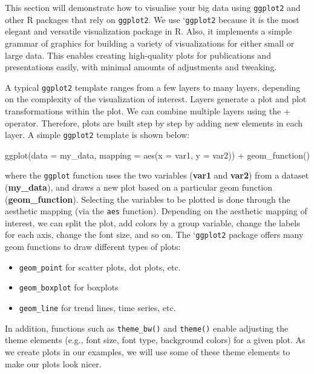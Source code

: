 \documentclass[
]{book}
\newenvironment{Shaded}{\begin{snugshade}}{\end{snugshade}}
\newcommand{\AttributeTok}[1]{\textcolor[rgb]{0.77,0.63,0.00}{#1}}
\newcommand{\FunctionTok}[1]{\textcolor[rgb]{0.00,0.00,0.00}{#1}}
\newcommand{\NormalTok}[1]{#1}
\newcommand{\SpecialCharTok}[1]{\textcolor[rgb]{0.00,0.00,0.00}{#1}}
\providecommand{\tightlist}{%
  \setlength{\itemsep}{0pt}\setlength{\parskip}{0pt}}
\begin{document}
This section will demonstrate how to visualise your big data using \texttt{ggplot2} and other R packages that rely on \texttt{ggplot2}. We use `\texttt{ggplot2} because it is the most elegant and versatile visualization package in R. Also, it implements a simple grammar of graphics for building a variety of visualizations for either small or large data. This enables creating high-quality plots for publications and presentations easily, with minimal amounts of adjustments and tweaking.

A typical \texttt{ggplot2} template ranges from a few layers to many layers, depending on the complexity of the visualization of interest. Layers generate a plot and plot transformations within the plot. We can combine multiple layers using the + operator. Therefore, plots are built step by step by adding new elements in each layer. A simple \texttt{ggplot2} template is shown below:

\begin{Shaded}
\begin{Highlighting}[]
\FunctionTok{ggplot}\NormalTok{(}\AttributeTok{data =}\NormalTok{ my\_data,}
       \AttributeTok{mapping =} \FunctionTok{aes}\NormalTok{(}\AttributeTok{x =}\NormalTok{ var1, }\AttributeTok{y =}\NormalTok{ var2)) }\SpecialCharTok{+}
  \FunctionTok{geom\_function}\NormalTok{()}
\end{Highlighting}
\end{Shaded}

where the \texttt{ggplot} function uses the two variables (\textbf{var1} and \textbf{var2}) from a dataset (\textbf{my\_data}), and draws a new plot based on a particular geom function (\textbf{geom\_function}). Selecting the variables to be plotted is done through the aesthetic mapping (via the \texttt{aes} function). Depending on the aesthetic mapping of interest, we can split the plot, add colors by a group variable, change the labels for each axis, change the font size, and so on. The `\texttt{ggplot2} package offers many geom functions to draw different types of plots:

\begin{itemize}
\tightlist
\item
  \texttt{geom\_point} for scatter plots, dot plots, etc.
\item
  \texttt{geom\_boxplot} for boxplots
\item
  \texttt{geom\_line} for trend lines, time series, etc.
\end{itemize}

In addition, functions such as \texttt{theme\_bw()} and \texttt{theme()} enable adjusting the theme elements (e.g., font size, font type, background colors) for a given plot. As we create plots in our examples, we will use some of these theme elements to make our plots look nicer.
\end{document}
